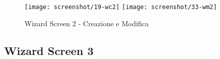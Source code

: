 \begin{figure}[!h] 
    \centering 
    \texttt{[image: screenshot/19-wc2]}
    \hfill
    \texttt{[image: screenshot/33-wm2]} 
    \caption{Wizard Screen 2 - Creazione e Modifica}
    \label{fig:w2}
\end{figure}


\subsection{Wizard Screen 3}
\label{subsec:wizard-screen-3}


